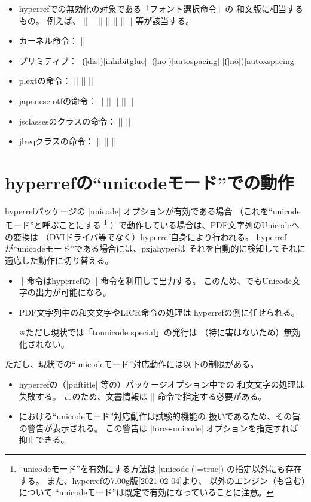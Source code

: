 \documentclass[uplatex,dvipdfmx,a4paper]{jsarticle}
\newcommand{\Pkg}[1]{\textsf{#1}}
\newcommand{\Note}{\par\noindent ※}
\newcommand{\Means}{：\quad}
\providecommand{\Strong}[1]{\textsf{#1}}
\begin{document}
\begin{itemize}
\item \Pkg{hyperref}での無効化の対象である「フォント選択命令」の
  和文版に相当するもの。
  例えば、
  |\textmc| |\gtfamily| |\kanjifamily| |\romanshape|
  |\usekanji| |\useroman| |\userelfont|
  等が該当する。
\item {\pLaTeX}カーネル命令\Means
  |\<|
\item {\pTeX}プリミティブ\Means
  |\|(|dis|)|inhibitglue| |\|(|no|)|autospacing| |\|(|no|)|autoxspacing|
\item \Pkg{plext}の命令\Means
  |\bou| |\kasen| |\rensuji|
\item \Pkg{japanese-otf}の命令\Means
  |\textmg| |\mgfamily| |\ltseries| |\ebseries| |\propshape|
\item \Pkg{jsclasses}のクラスの命令\Means
  |\maybeblue| |\HUGE|
\item \Pkg{jlreq}クラスの命令\Means
  |\jafontsize| |\tatechuyoko| |\jidori| %
\end{itemize}

\section{hyperrefの“unicodeモード”での動作}
\label{sec:Unicode-mode}

\Pkg{hyperref}パッケージの |unicode| オプションが有効である場合
（これを“unicodeモード”と呼ぶことにする
\footnote{“unicodeモード”を有効にする方法は |unicode|(|=true|)
  の指定以外にも存在する。
  また、\Pkg{hyperref}の7.00g版[2021-02-04]より、
  {\pLaTeX}以外のエンジン（\Strong{{\upLaTeX}も含む}）について
  “unicodeモード”は既定で有効になっていることに注意。}%
）で動作している場合は、PDF文字列のUnicodeへの変換は
（DVIドライバ等でなく）\Pkg{hyperref}自身により行われる。
\Pkg{hyperref}が“unicodeモード”である場合には、\Pkg{pxjahyper}は
それを自動的に検知してそれに適応した動作に切り替える。
\begin{itemize}
\item |\Ux| 命令は\Pkg{hyperref}の |\unichar| 命令を利用して出力する。
  このため、{\pLaTeX}でもUnicode文字の出力が可能になる。
\item PDF文字列中の和文文字やLICR命令の処理は
  \Pkg{hyperref}の側に任せられる。
  \Note ただし現状では「tounicode special」の発行は
  （特に害はないため）無効化されない。
\end{itemize}
ただし、現状での“unicodeモード”対応動作には以下の制限がある。
\begin{itemize}
\item \Pkg{hyperref}の（|pdftitle| 等の）パッケージオプション中での
  和文文字の処理は失敗する。
  このため、文書情報は |\hypersetup| 命令で指定する必要がある。
\item {\pLaTeX}における“unicodeモード”対応動作は試験的機能の
  扱いであるため、その旨の警告が表示される。
  この警告は |force-unicode| オプションを指定すれば抑止できる。
\end{itemize}
\end{document}
